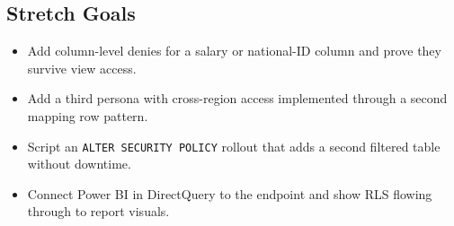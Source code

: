 \subsection*{Stretch Goals}
\begin{itemize}
    \item Add column-level denies for a salary or national-ID column and prove they survive view access.
    \item Add a third persona with cross-region access implemented through a second mapping row pattern.
    \item Script an \texttt{ALTER SECURITY POLICY} rollout that adds a second filtered table without downtime.
    \item Connect Power BI in DirectQuery to the endpoint and show RLS flowing through to report visuals.
\end{itemize}
